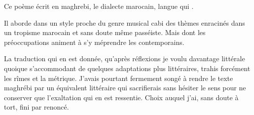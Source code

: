 \begin{prose}
Ce poème écrit en maghrebi, le dialecte marocain, langue qui .

Il aborde dans un style proche du genre musical cabi  des thèmes enracinés dans un tropisme marocain et sans doute même passéiste. Mais dont les préoccupations animent à s’y méprendre les contemporains.

La traduction qui en est donnée, qu’après réﬂexions je voulu davantage littérale quoique s’accommodant de quelques adaptations plus littéraires, trahis forcément les rîmes et la métrique.
J’avais pourtant fermement songé à rendre le texte maghrébi par un équivalent littéraire qui sacriﬁerais sans hésiter le sens pour ne conserver que l’exaltation qui en est ressentie. Choix auquel j’ai, sans doute à tort, ﬁni par renoncé.
\end{prose}

